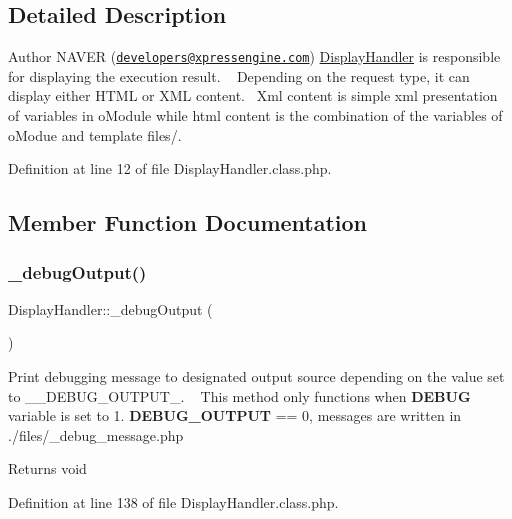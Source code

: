 \subsection{Detailed Description}
\begin{DoxyAuthor}{Author}
N\+A\+V\+ER (\href{mailto:developers@xpressengine.com}{\tt developers@xpressengine.\+com}) \hyperlink{classDisplayHandler}{Display\+Handler} is responsible for displaying the execution result. ~\newline
 Depending on the request type, it can display either H\+T\+ML or X\+ML content.~\newline
 Xml content is simple xml presentation of variables in o\+Module while html content is the combination of the variables of o\+Modue and template files/. 
\end{DoxyAuthor}


Definition at line 12 of file Display\+Handler.\+class.\+php.



\subsection{Member Function Documentation}
\mbox{\label{classDisplayHandler_ade82618e903db5607dbc311f87f997f7}} 
\subsubsection{\texorpdfstring{\+\_\+debug\+Output()}{\_debugOutput()}}
{\footnotesize\ttfamily Display\+Handler\+::\+\_\+debug\+Output (\begin{DoxyParamCaption}{ }\end{DoxyParamCaption})}

Print debugging message to designated output source depending on the value set to \+\_\+\+\_\+\+D\+E\+B\+U\+G\+\_\+\+O\+U\+T\+P\+U\+T\+\_\+. ~\newline
This method only functions when {\bfseries D\+E\+B\+UG} variable is set to 1. {\bfseries D\+E\+B\+U\+G\+\_\+\+O\+U\+T\+P\+UT} == 0, messages are written in ./files/\+\_\+debug\+\_\+message.php \begin{DoxyReturn}{Returns}
void 
\end{DoxyReturn}


Definition at line 138 of file Display\+Handler.\+class.\+php.

